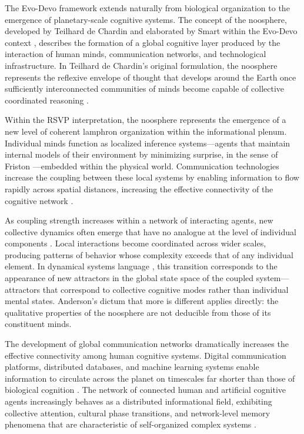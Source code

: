\documentclass[12pt]{article}
\begin{document}
The Evo-Devo framework extends naturally from biological organization to the emergence of planetary-scale cognitive systems. The concept of the noosphere, developed by Teilhard de Chardin \cite{dechardin1955} and elaborated by Smart within the Evo-Devo context \cite{smart2023}, describes the formation of a global cognitive layer produced by the interaction of human minds, communication networks, and technological infrastructure. In Teilhard de Chardin's original formulation, the noosphere represents the reflexive envelope of thought that develops around the Earth once sufficiently interconnected communities of minds become capable of collective coordinated reasoning \cite{dechardin1955}.

Within the RSVP interpretation, the noosphere represents the emergence of a new level of coherent lamphron organization within the informational plenum. Individual minds function as localized inference systems---agents that maintain internal models of their environment by minimizing surprise, in the sense of Friston \cite{friston2010}---embedded within the physical world. Communication technologies increase the coupling between these local systems by enabling information to flow rapidly across spatial distances, increasing the effective connectivity of the cognitive network \cite{barabasi2016,smart2023}.

As coupling strength increases within a network of interacting agents, new collective dynamics often emerge that have no analogue at the level of individual components \cite{anderson1972,holland1998}. Local interactions become coordinated across wider scales, producing patterns of behavior whose complexity exceeds that of any individual element. In dynamical systems language \cite{strogatz1994}, this transition corresponds to the appearance of new attractors in the global state space of the coupled system---attractors that correspond to collective cognitive modes rather than individual mental states. Anderson's dictum that more is different \cite{anderson1972} applies directly: the qualitative properties of the noosphere are not deducible from those of its constituent minds.

The development of global communication networks dramatically increases the effective connectivity among human cognitive systems. Digital communication platforms, distributed databases, and machine learning systems enable information to circulate across the planet on timescales far shorter than those of biological cognition \cite{barabasi2016,smart2023}. The network of connected human and artificial cognitive agents increasingly behaves as a distributed informational field, exhibiting collective attention, cultural phase transitions, and network-level memory phenomena that are characteristic of self-organized complex systems \cite{bak1996,mitchell2009}.
\end{document}
